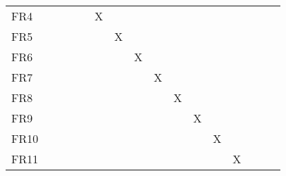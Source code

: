 \documentclass[12pt, titlepage]{article}
\begin{document}
\begin{longtable}{llllllllllllllll}
\multicolumn{1}{l|}{FR4} & \multicolumn{1}{c}{} & \multicolumn{1}{c}{} & \multicolumn{1}{c}{} & \multicolumn{1}{c}{} & \multicolumn{1}{c}{X} & \multicolumn{1}{c}{} & \multicolumn{1}{c}{} & \multicolumn{1}{c}{} & \multicolumn{1}{c}{} & \multicolumn{1}{c}{} &  & \multicolumn{1}{c}{} & \multicolumn{1}{c}{} & \multicolumn{1}{c}{} & \multicolumn{1}{c}{} \\
\multicolumn{1}{l|}{FR5} & \multicolumn{1}{c}{} & \multicolumn{1}{c}{} & \multicolumn{1}{c}{} & \multicolumn{1}{c}{} & \multicolumn{1}{c}{} & \multicolumn{1}{c}{X} & \multicolumn{1}{c}{} & \multicolumn{1}{c}{} & \multicolumn{1}{c}{} & \multicolumn{1}{c}{} &  & \multicolumn{1}{c}{} & \multicolumn{1}{c}{} & \multicolumn{1}{c}{} & \multicolumn{1}{c}{} \\
\multicolumn{1}{l|}{FR6} & \multicolumn{1}{c}{} & \multicolumn{1}{c}{} & \multicolumn{1}{c}{} & \multicolumn{1}{c}{} & \multicolumn{1}{c}{} & \multicolumn{1}{c}{} & \multicolumn{1}{c}{X} & \multicolumn{1}{c}{} & \multicolumn{1}{c}{} & \multicolumn{1}{c}{} &  & \multicolumn{1}{c}{} & \multicolumn{1}{c}{} & \multicolumn{1}{c}{} & \multicolumn{1}{c}{} \\
\multicolumn{1}{l|}{FR7} & \multicolumn{1}{c}{} & \multicolumn{1}{c}{} & \multicolumn{1}{c}{} & \multicolumn{1}{c}{} & \multicolumn{1}{c}{} & \multicolumn{1}{c}{} & \multicolumn{1}{c}{} & \multicolumn{1}{c}{X} & \multicolumn{1}{c}{} & \multicolumn{1}{c}{} &  & \multicolumn{1}{c}{} & \multicolumn{1}{c}{} & \multicolumn{1}{c}{} & \multicolumn{1}{c}{} \\
\multicolumn{1}{l|}{FR8} & \multicolumn{1}{c}{} & \multicolumn{1}{c}{} & \multicolumn{1}{c}{} & \multicolumn{1}{c}{} & \multicolumn{1}{c}{} & \multicolumn{1}{c}{} & \multicolumn{1}{c}{} & \multicolumn{1}{c}{} & \multicolumn{1}{c}{X} & \multicolumn{1}{c}{} &  & \multicolumn{1}{c}{} & \multicolumn{1}{c}{} & \multicolumn{1}{c}{} & \multicolumn{1}{c}{} \\
\multicolumn{1}{l|}{FR9} & \multicolumn{1}{c}{} & \multicolumn{1}{c}{} & \multicolumn{1}{c}{} & \multicolumn{1}{c}{} & \multicolumn{1}{c}{} & \multicolumn{1}{c}{} & \multicolumn{1}{c}{} & \multicolumn{1}{c}{} & \multicolumn{1}{c}{} & \multicolumn{1}{c}{X} &  & \multicolumn{1}{c}{} & \multicolumn{1}{c}{} & \multicolumn{1}{c}{} & \multicolumn{1}{c}{} \\
\multicolumn{1}{l|}{FR10} &  &  &  &  &  &  &  &  &  & \multicolumn{1}{c}{} & \multicolumn{1}{c}{X} & \multicolumn{1}{c}{} & \multicolumn{1}{c}{} & \multicolumn{1}{c}{} & \multicolumn{1}{c}{} \\
\multicolumn{1}{l|}{FR11} &  &  &  &  &  &  &  &  &  & \multicolumn{1}{c}{} &  & \multicolumn{1}{c}{X} & \multicolumn{1}{c}{} & \multicolumn{1}{c}{} & \multicolumn{1}{c}{} \\

\end{longtable}
\end{document}
